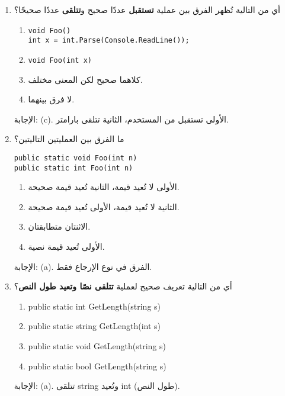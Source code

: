 \documentclass[14pt]{extarticle}
\begin{document}
\begin{enumerate}[itemsep=1.8em]
\clearpage
\item
أي من التالية تُظهر الفرق بين عملية \textbf{تستقبل} عددًا صحيح و\textbf{تتلقى} عددًا صحيحًا؟
\begin{enumerate}[label=(\alph*)]
    \item \begin{verbatim}
void Foo()
int x = int.Parse(Console.ReadLine());
\end{verbatim}
    \item \begin{verbatim}
void Foo(int x)
\end{verbatim}
    \item كلاهما صحيح لكن المعنى مختلف.
    \item لا فرق بينهما.
\end{enumerate}
\ifwithsols
\begin{boxSolution}
الإجابة: (c).
الأولى تستقبل من المستخدم، الثانية تتلقى بارامتر.
\end{boxSolution}
\fi


\item
ما الفرق بين العمليتين التاليتين؟
\begin{verbatim}
public static void Foo(int n)
public static int Foo(int n)
\end{verbatim}
\begin{enumerate}[label=(\alph*)]
    \item الأولى لا تُعيد قيمة، الثانية تُعيد قيمة صحيحة.
    \item الثانية لا تُعيد قيمة، الأولى تُعيد قيمة صحيحة.
    \item الاثنتان متطابقتان.
    \item الأولى تُعيد قيمة نصية.
\end{enumerate}
\ifwithsols
\begin{boxSolution}
الإجابة: (a).
الفرق في نوع الإرجاع فقط.
\end{boxSolution}
\fi


\item
أي من التالية تعريف صحيح لعملية \textbf{تتلقى نصًا وتعيد طول النص}؟
\begin{english}
\begin{enumerate}[label=(\alph*)]
    \item public static int GetLength(string s)
    \item public static string GetLength(int s)
    \item public static void GetLength(string s)
    \item public static bool GetLength(string s)
\end{enumerate}
\end{english}
\ifwithsols
\begin{boxSolution}
الإجابة: (a).
تتلقى string وتُعيد int (طول النص).
\end{boxSolution}
\fi


\end{enumerate}
\end{document}
